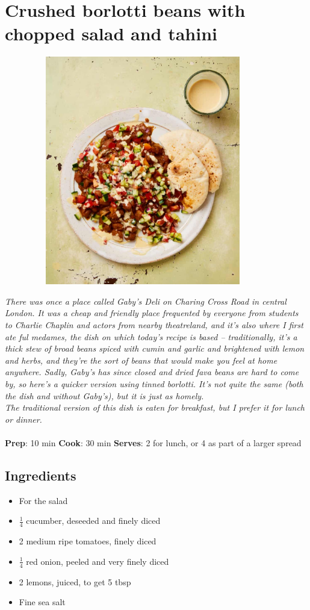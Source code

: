 \documentclass{book}
\begin{document}
\section{Crushed borlotti beans with chopped salad and tahini}
\begin{figure}
\centering\includegraphics[width=10cm,height=10cm,keepaspectratio]{Recipe_Pictures/Crushed_borlotti_beans_with_chopped_salad_and_tahini.png}
\end{figure}
\emph{There was once a place called Gaby’s Deli on Charing Cross Road in central London. It was a cheap and friendly place frequented by everyone from students to Charlie Chaplin and actors from nearby theatreland, and it’s also where I first ate ful medames, the dish on which today’s recipe is based – traditionally, it’s a thick stew of broad beans spiced with cumin and garlic and brightened with lemon and herbs, and they’re the sort of beans that would make you feel at home anywhere. Sadly, Gaby’s has since closed and dried fava beans are hard to come by, so here’s a quicker version using tinned borlotti. It’s not quite the same (both the dish and without Gaby’s), but it is just as homely.\\ 
The traditional version of this dish is eaten for breakfast, but I prefer it for lunch or dinner.}\\\\ 
\textbf{Prep}: 10 min
\textbf{Cook}: 30 min
\textbf{Serves}: 2 for lunch, or 4 as part of a larger spread
\subsection*{Ingredients}
\begin{itemize}
\item For the salad
\item $\frac{1}{4}$ cucumber, deseeded and finely diced
\item 2 medium ripe tomatoes, finely diced
\item $\frac{1}{4}$ red onion, peeled and very finely diced
\item 2 lemons, juiced, to get 5 tbsp
\item Fine sea salt
\end{itemize}
\end{document}
